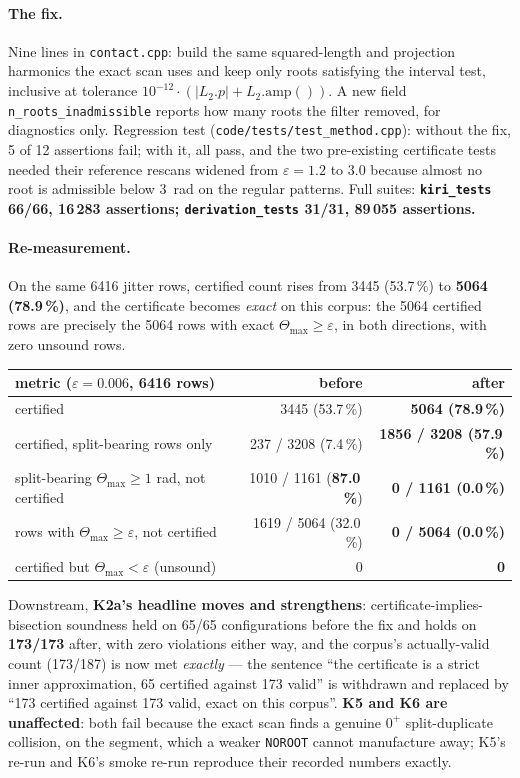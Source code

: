 \documentclass[10pt,a4paper]{article}
\newcommand{\fn}[1]{\nolinkurl{#1}}
\begin{document}
\paragraph{The fix.} Nine lines in \fn{contact.cpp}: build the same squared-length and projection
harmonics the exact scan uses and keep only roots satisfying the interval test, inclusive at
tolerance $10^{-12}\cdot(|L_2.p|+L_2.\mathrm{amp}())$. A new field
\fn{n\_roots\_inadmissible} reports how many roots the filter removed, for diagnostics only.
Regression test (\fn{code/tests/test\_method.cpp}): without the fix, 5 of 12 assertions fail; with
it, all pass, and the two pre-existing certificate tests needed their reference rescans widened
from $\varepsilon=1.2$ to $3.0$ because almost no root is admissible below 3~rad on the regular
patterns. Full suites: \textbf{\fn{kiri\_tests} 66/66, 16\,283 assertions; \fn{derivation\_tests}
31/31, 89\,055 assertions.}

\paragraph{Re-measurement.} On the same 6416 jitter rows, certified count rises from 3445
(53.7\,\%) to \textbf{5064 (78.9\,\%)}, and the certificate becomes \emph{exact} on this corpus:
the 5064 certified rows are precisely the 5064 rows with exact $\Theta_{\max}\ge\varepsilon$, in
both directions, with zero unsound rows.

\begin{table}[h]\centering\small
\begin{tabular}{@{}lrr@{}}
\toprule
metric ($\varepsilon=0.006$, 6416 rows) & before & after \\
\midrule
certified & 3445 (53.7\,\%) & \textbf{5064 (78.9\,\%)} \\
certified, split-bearing rows only & 237 / 3208 (7.4\,\%) & \textbf{1856 / 3208 (57.9\,\%)} \\
split-bearing $\Theta_{\max}\ge1$ rad, not certified & 1010 / 1161 (\textbf{87.0\,\%}) &
\textbf{0 / 1161 (0.0\,\%)} \\
rows with $\Theta_{\max}\ge\varepsilon$, not certified & 1619 / 5064 (32.0\,\%) &
\textbf{0 / 5064 (0.0\,\%)} \\
certified but $\Theta_{\max}<\varepsilon$ (unsound) & 0 & \textbf{0} \\
\bottomrule
\end{tabular}
\end{table}

Downstream, \textbf{K2a's headline moves and strengthens}: certificate-implies-bisection
soundness held on 65/65 configurations before the fix and holds on \textbf{173/173} after, with
zero violations either way, and the corpus's actually-valid count (173/187) is now met
\emph{exactly} --- the sentence ``the certificate is a strict inner approximation, 65 certified
against 173 valid'' is withdrawn and replaced by ``173 certified against 173 valid, exact on this
corpus''. \textbf{K5 and K6 are unaffected}: both fail because the exact scan finds a genuine
$0^+$ split-duplicate collision, on the segment, which a weaker \texttt{NOROOT} cannot manufacture
away; K5's re-run and K6's smoke re-run reproduce their recorded numbers exactly.
\end{document}
